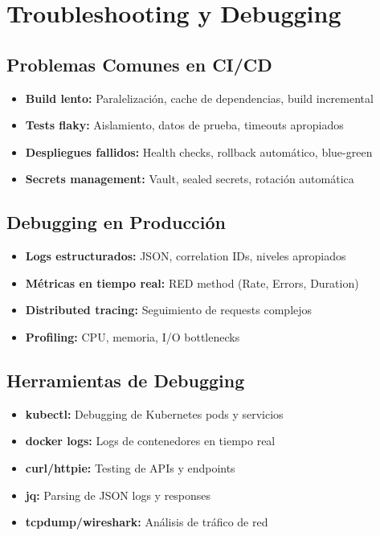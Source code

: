 \documentclass[12pt,a4paper]{article}
\begin{document}
\section{Troubleshooting y Debugging}

\subsection{Problemas Comunes en CI/CD}
\begin{itemize}
    \item \textbf{Build lento:} Paralelización, cache de dependencias, build incremental
    \item \textbf{Tests flaky:} Aislamiento, datos de prueba, timeouts apropiados
    \item \textbf{Despliegues fallidos:} Health checks, rollback automático, blue-green
    \item \textbf{Secrets management:} Vault, sealed secrets, rotación automática
\end{itemize}

\subsection{Debugging en Producción}
\begin{itemize}
    \item \textbf{Logs estructurados:} JSON, correlation IDs, niveles apropiados
    \item \textbf{Métricas en tiempo real:} RED method (Rate, Errors, Duration)
    \item \textbf{Distributed tracing:} Seguimiento de requests complejos
    \item \textbf{Profiling:} CPU, memoria, I/O bottlenecks
\end{itemize}

\subsection{Herramientas de Debugging}
\begin{itemize}
    \item \textbf{kubectl:} Debugging de Kubernetes pods y servicios
    \item \textbf{docker logs:} Logs de contenedores en tiempo real
    \item \textbf{curl/httpie:} Testing de APIs y endpoints
    \item \textbf{jq:} Parsing de JSON logs y responses
    \item \textbf{tcpdump/wireshark:} Análisis de tráfico de red
\end{itemize}
\end{document}
